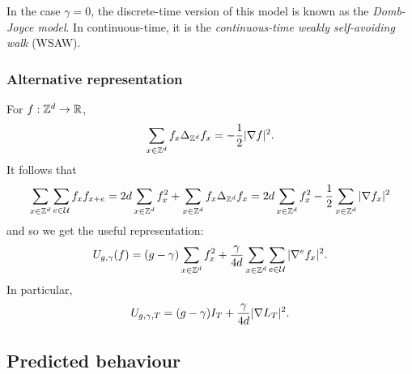 In the case $\gamma = 0$, the discrete-time version of this model is known as
the \emph{Domb-Joyce model}. In continuous-time, it is the
\emph{continuous-time weakly self-avoiding walk} (WSAW).

\subsubsection{Alternative representation}

For $f : { {{\mathbb Z}}^d } \rightarrow {\mathbb R}$,
\begin{equation}
\label{e:sbp}
\sum_{x\in{ {{\mathbb Z}}^d }}   f_x \Delta_{{ {{\mathbb Z}}^d }} f_x
=
-\frac{1}{2} |\nabla f|^2.
\end{equation}
It follows that
\begin{equation}
\sum_{x\in{ {{\mathbb Z}}^d }} \sum_{e\in\mathcal{U}} f_x f_{x+e}
=
2 d \sum_{x\in{ {{\mathbb Z}}^d }} f_x^2
+ \sum_{x\in{ {{\mathbb Z}}^d }} f_x \Delta_{{ {{\mathbb Z}}^d }} f_x
=
2 d \sum_{x\in{ {{\mathbb Z}}^d }} f_x^2
- \frac{1}{2} \sum_{x\in{ {{\mathbb Z}}^d }} |\nabla f_x|^2
\end{equation}
and so we get the useful representation:
\begin{equation}
\label{e:Udef-pos}
U_{g,\gamma}(f)
= (g - \gamma) \sum_{x\in{ {{\mathbb Z}}^d }} f_x^2
+ \frac{\gamma}{4d} \sum_{x\in{ {{\mathbb Z}}^d }} \sum_{e\in\mathcal{U}} |\nabla^e f_x|^2.
\end{equation}
In particular,
\begin{equation}
  \label{e:V2}
  U_{g,\gamma,T} =
  (g - \gamma) I_T
  + \frac{\gamma}{4d}
  |\nabla L_T|^2
  .
\end{equation}


\subsection{Predicted behaviour}



